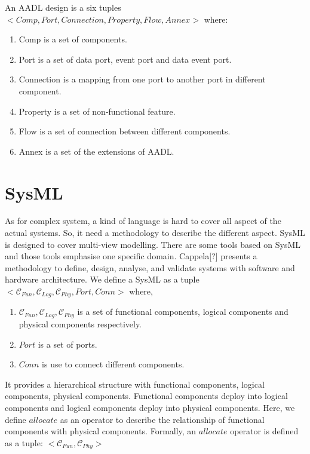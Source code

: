 An AADL design is a six tuples $<Comp, Port, Connection, Property, Flow, Annex>$ where:
\begin{enumerate}
\item Comp is a set of components.
\item Port is a set of data port, event port and data event port.
\item Connection is a mapping from one port to another port in different component.
\item Property is a set of non-functional feature.
\item Flow is a set of connection between different components. 
\item Annex is a set of the extensions of AADL.
\end{enumerate}







\section{SysML}

As for complex system, a kind of language is hard to cover all aspect of the actual systems. So, it need a methodology to describe the different aspect. SysML is designed to cover multi-view modelling. There are some tools based on SysML and those tools emphasise one specific domain. {\color{red}Cappela[?] presents a methodology to define, design, analyse, and validate systems with software and hardware architecture.}  We define a SysML as a tuple $<\mathcal{C}_{Fun}, \mathcal{C}_{Log}, \mathcal{C}_{Phy}, Port, Conn>$ where,
\begin{enumerate}
\item $\mathcal{C}_{Fun}, \mathcal{C}_{Log}, \mathcal{C}_{Phy}$ is a set of functional components, logical components and physical components respectively.
\item $Port$ is a set of ports.
\item $Conn$ is use to connect different components.
\end{enumerate}

It provides a hierarchical structure with functional components, logical components, physical components. Functional components deploy into logical components and logical components deploy into physical components. Here, we define $allocate$ as an operator to describe the relationship of functional components with physical components. Formally, an $allocate$ operator is defined as a tuple: $<\mathcal{C}_{Fun}, \mathcal{C}_{Phy}>$

